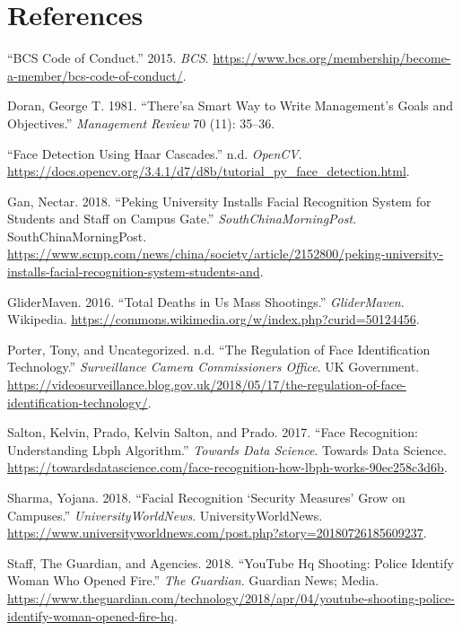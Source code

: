 \documentclass[
  english,
  a4paper,
,tablecaptionabove
]{scrartcl}
\begin{document}
\hypertarget{references}{%
\section*{References}\label{references}}

\hypertarget{refs}{}
\leavevmode\hypertarget{ref-bcs}{}%
``BCS Code of Conduct.'' 2015. \emph{BCS}.
\url{https://www.bcs.org/membership/become-a-member/bcs-code-of-conduct/}.

\leavevmode\hypertarget{ref-doran1981there}{}%
Doran, George T. 1981. ``There'sa Smart Way to Write Management's Goals
and Objectives.'' \emph{Management Review} 70 (11): 35--36.

\leavevmode\hypertarget{ref-opencv}{}%
``Face Detection Using Haar Cascades.'' n.d. \emph{OpenCV}.
\url{https://docs.opencv.org/3.4.1/d7/d8b/tutorial_py_face_detection.html}.

\leavevmode\hypertarget{ref-china-facerec}{}%
Gan, Nectar. 2018. ``Peking University Installs Facial Recognition
System for Students and Staff on Campus Gate.''
\emph{SouthChinaMorningPost}. SouthChinaMorningPost.
\url{https://www.scmp.com/news/china/society/article/2152800/peking-university-installs-facial-recognition-system-students-and}.

\leavevmode\hypertarget{ref-glidermaven}{}%
GliderMaven. 2016. ``Total Deaths in Us Mass Shootings.''
\emph{GliderMaven}. Wikipedia.
\url{https://commons.wikimedia.org/w/index.php?curid=50124456}.

\leavevmode\hypertarget{ref-porter_uncategorized}{}%
Porter, Tony, and Uncategorized. n.d. ``The Regulation of Face
Identification Technology.'' \emph{Surveillance Camera Commissioners
Office}. UK Government.
\url{https://videosurveillance.blog.gov.uk/2018/05/17/the-regulation-of-face-identification-technology/}.

\leavevmode\hypertarget{ref-salton_prado_salton_prado_2017}{}%
Salton, Kelvin, Prado, Kelvin Salton, and Prado. 2017. ``Face
Recognition: Understanding Lbph Algorithm.'' \emph{Towards Data
Science}. Towards Data Science.
\url{https://towardsdatascience.com/face-recognition-how-lbph-works-90ec258c3d6b}.

\leavevmode\hypertarget{ref-china-facialrec}{}%
Sharma, Yojana. 2018. ``Facial Recognition `Security Measures' Grow on
Campuses.'' \emph{UniversityWorldNews}. UniversityWorldNews.
\url{https://www.universityworldnews.com/post.php?story=20180726185609237}.

\leavevmode\hypertarget{ref-agencies_2018}{}%
Staff, The Guardian, and Agencies. 2018. ``YouTube Hq Shooting: Police
Identify Woman Who Opened Fire.'' \emph{The Guardian}. Guardian News;
Media.
\url{https://www.theguardian.com/technology/2018/apr/04/youtube-shooting-police-identify-woman-opened-fire-hq}.
\end{document}
